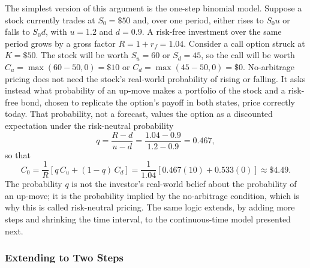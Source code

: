 \documentclass[../ai_in_finance]{subfiles}
\begin{document}
The simplest version of this argument is the one-step binomial model. Suppose a stock currently trades at $S_0 = \$50$ and, over one period, either rises to $S_0 u$ or falls to $S_0 d$, with $u=1.2$ and $d=0.9$. A risk-free investment over the same period grows by a gross factor $R = 1+r_f = 1.04$. Consider a call option struck at $K=\$50$. The stock will be worth $S_u = 60$ or $S_d = 45$, so the call will be worth $C_u = \max(60-50,0) = \$10$ or $C_d = \max(45-50,0) = \$0$. No-arbitrage pricing does not need the stock's real-world probability of rising or falling. It asks instead what probability of an up-move makes a portfolio of the stock and a risk-free bond, chosen to replicate the option's payoff in both states, price correctly today. That probability, not a forecast, values the option as a discounted expectation under the risk-neutral probability
\begin{equation}
q = \frac{R-d}{u-d} = \frac{1.04-0.9}{1.2-0.9} = 0.467,\label{eq:valuation-risk-neutral-q}
\end{equation}
so that
\begin{equation}
C_0 = \frac{1}{R}[q\,C_u + (1-q)\,C_d] = \frac{1}{1.04}[0.467(10) + 0.533(0)] \approx \$4.49.\label{eq:valuation-binomial-call}
\end{equation}
The probability $q$ is not the investor's real-world belief about the probability of an up-move; it is the probability implied by the no-arbitrage condition, which is why this is called risk-neutral pricing. The same logic extends, by adding more steps and shrinking the time interval, to the continuous-time model presented next.

\subsubsection*{Extending to Two Steps}
\end{document}
